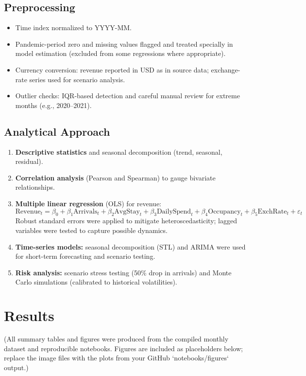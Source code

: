 \documentclass[12pt,a4paper]{article}
\begin{document}
\subsection{Preprocessing}
\begin{itemize}
  \item Time index normalized to YYYY-MM.
  \item Pandemic-period zero and missing values flagged and treated specially in model estimation (excluded from some regressions where appropriate).
  \item Currency conversion: revenue reported in USD as in source data; exchange-rate series used for scenario analysis.
  \item Outlier checks: IQR-based detection and careful manual review for extreme months (e.g., 2020--2021).
\end{itemize}

\subsection{Analytical Approach}
\begin{enumerate}
  \item \textbf{Descriptive statistics} and seasonal decomposition (trend, seasonal, residual).
  \item \textbf{Correlation analysis} (Pearson and Spearman) to gauge bivariate relationships.
  \item \textbf{Multiple linear regression} (OLS) for revenue:
  \[
    \text{Revenue}_t = \beta_0 + \beta_1 \text{Arrivals}_t + \beta_2 \text{AvgStay}_t + \beta_3 \text{DailySpend}_t + \beta_4 \text{Occupancy}_t + \beta_5 \text{ExchRate}_t + \varepsilon_t
  \]
  Robust standard errors were applied to mitigate heteroscedasticity; lagged variables were tested to capture possible dynamics.
  \item \textbf{Time-series models:} seasonal decomposition (STL) and ARIMA were used for short-term forecasting and scenario testing.
  \item \textbf{Risk analysis:} scenario stress testing (50\% drop in arrivals) and Monte Carlo simulations (calibrated to historical volatilities).
\end{enumerate}

\section{Results}
(All summary tables and figures were produced from the compiled monthly dataset and reproducible notebooks. Figures are included as placeholders below; replace the image files with the plots from your GitHub `notebooks/figures` output.)
\end{document}
